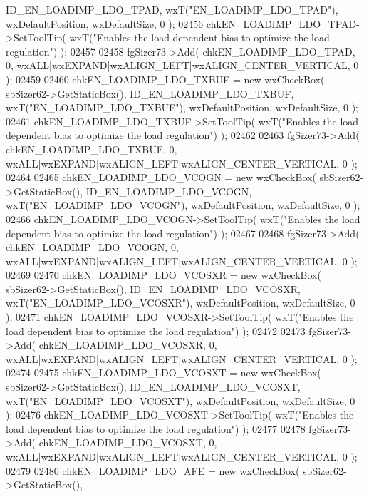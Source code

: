 \begin{DoxyCode}
      ID_EN_LOADIMP_LDO_TPAD, wxT(\textcolor{stringliteral}{"EN\_LOADIMP\_LDO\_TPAD"}), wxDefaultPosition, wxDefaultSize, 0 );
02456     chkEN_LOADIMP_LDO_TPAD->SetToolTip( wxT(\textcolor{stringliteral}{"Enables the load dependent bias to optimize the load
       regulation"}) );
02457     
02458     fgSizer73->Add( chkEN_LOADIMP_LDO_TPAD, 0, wxALL|wxEXPAND|wxALIGN\_LEFT|wxALIGN\_CENTER\_VERTICAL, 0 );
02459     
02460     chkEN_LOADIMP_LDO_TXBUF = \textcolor{keyword}{new} wxCheckBox( sbSizer62->GetStaticBox(), 
      ID_EN_LOADIMP_LDO_TXBUF, wxT(\textcolor{stringliteral}{"EN\_LOADIMP\_LDO\_TXBUF"}), wxDefaultPosition, wxDefaultSize, 0 );
02461     chkEN_LOADIMP_LDO_TXBUF->SetToolTip( wxT(\textcolor{stringliteral}{"Enables the load dependent bias to optimize the load
       regulation"}) );
02462     
02463     fgSizer73->Add( chkEN_LOADIMP_LDO_TXBUF, 0, wxALL|wxEXPAND|wxALIGN\_LEFT|wxALIGN\_CENTER\_VERTICAL, 0 );
02464     
02465     chkEN_LOADIMP_LDO_VCOGN = \textcolor{keyword}{new} wxCheckBox( sbSizer62->GetStaticBox(), 
      ID_EN_LOADIMP_LDO_VCOGN, wxT(\textcolor{stringliteral}{"EN\_LOADIMP\_LDO\_VCOGN"}), wxDefaultPosition, wxDefaultSize, 0 );
02466     chkEN_LOADIMP_LDO_VCOGN->SetToolTip( wxT(\textcolor{stringliteral}{"Enables the load dependent bias to optimize the load
       regulation"}) );
02467     
02468     fgSizer73->Add( chkEN_LOADIMP_LDO_VCOGN, 0, wxALL|wxEXPAND|wxALIGN\_LEFT|wxALIGN\_CENTER\_VERTICAL, 0 );
02469     
02470     chkEN_LOADIMP_LDO_VCOSXR = \textcolor{keyword}{new} wxCheckBox( sbSizer62->GetStaticBox(), 
      ID_EN_LOADIMP_LDO_VCOSXR, wxT(\textcolor{stringliteral}{"EN\_LOADIMP\_LDO\_VCOSXR"}), wxDefaultPosition, wxDefaultSize, 0 );
02471     chkEN_LOADIMP_LDO_VCOSXR->SetToolTip( wxT(\textcolor{stringliteral}{"Enables the load dependent bias to optimize the load
       regulation"}) );
02472     
02473     fgSizer73->Add( chkEN_LOADIMP_LDO_VCOSXR, 0, wxALL|wxEXPAND|wxALIGN\_LEFT|wxALIGN\_CENTER\_VERTICAL, 0 );
02474     
02475     chkEN_LOADIMP_LDO_VCOSXT = \textcolor{keyword}{new} wxCheckBox( sbSizer62->GetStaticBox(), 
      ID_EN_LOADIMP_LDO_VCOSXT, wxT(\textcolor{stringliteral}{"EN\_LOADIMP\_LDO\_VCOSXT"}), wxDefaultPosition, wxDefaultSize, 0 );
02476     chkEN_LOADIMP_LDO_VCOSXT->SetToolTip( wxT(\textcolor{stringliteral}{"Enables the load dependent bias to optimize the load
       regulation"}) );
02477     
02478     fgSizer73->Add( chkEN_LOADIMP_LDO_VCOSXT, 0, wxALL|wxEXPAND|wxALIGN\_LEFT|wxALIGN\_CENTER\_VERTICAL, 0 );
02479     
02480     chkEN_LOADIMP_LDO_AFE = \textcolor{keyword}{new} wxCheckBox( sbSizer62->GetStaticBox(), 

\end{DoxyCode}
